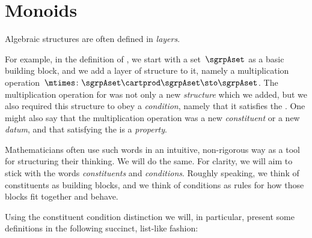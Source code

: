 
\section{Monoids}
\label{sec:parallelism-monoids}

Algebraic structures are often defined in \emph{layers}.

For example, in the definition of , we start with a set~$\sgrpAset$ as a basic building block, and we add a layer of structure to it, namely a multiplication operation~$\mtimes \colon \sgrpAset \cartprod \sgrpAset \sto \sgrpAset$.
The multiplication operation for  was not only a new \emph{structure} which we added, but we also required this structure to obey a \emph{condition}, namely that it satisfies the .
One might also say that the multiplication operation was a new \emph{constituent} or a new \emph{datum}, and that satisfying the  is a \emph{property}.

Mathematicians often use such words in an intuitive, non-rigorous way as a tool for structuring their thinking.
We will do the same.
For clarity, we will aim to stick with the words \emph{constituents} and \emph{conditions}.
Roughly speaking, we think of constituents as building blocks, and we think of conditions as rules for how those blocks fit together and behave.

Using the constituent \vs condition distinction we will, in particular, present some definitions in the following succinct, list-like fashion:

\begin{marginfigure}
    \centering
    \caption{The neutral element, expressed as a function.}
    \label{fig:monoid-diagram}
\end{marginfigure}

\begin{marginfigure}
    \centering
    \caption{Monoid Commutative Diagram}
    \label{fig:monoid-commutative-diagram}
\end{marginfigure}


